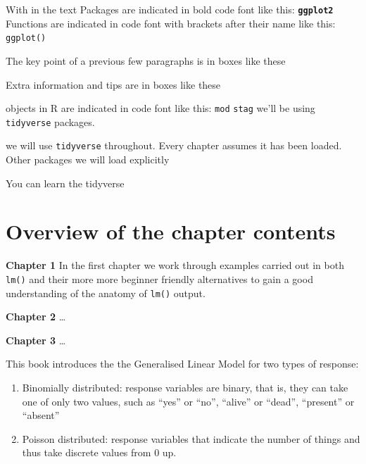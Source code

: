 \documentclass[
]{book}
\providecommand{\tightlist}{%
  \setlength{\itemsep}{0pt}\setlength{\parskip}{0pt}}
\begin{document}
With in the text
Packages are indicated in bold code font like this: \textbf{\texttt{ggplot2}}
Functions are indicated in code font with brackets after their name like this: \texttt{ggplot()}

\begin{key}

The key point of a previous few paragraphs is in boxes like these

\end{key}

\begin{fyi}

Extra information and tips are in boxes like these

\end{fyi}

objects in R are indicated in code font like this: \texttt{mod} \texttt{stag}
we'll be using \texttt{tidyverse} \citep{tidyverse2019} packages.

we will use \texttt{tidyverse} throughout. Every chapter assumes it has been loaded. Other packages we will load explicitly

\begin{fyi}

You can learn the tidyverse

\end{fyi}

\hypertarget{overview-of-the-chapter-contents}{%
\section{Overview of the chapter contents}\label{overview-of-the-chapter-contents}}

\textbf{Chapter 1}
In the first chapter we work through examples carried out in both \texttt{lm()} and their more more beginner friendly alternatives to gain a good understanding of the anatomy of \texttt{lm()} output.

\textbf{Chapter 2}
\ldots{}

\textbf{Chapter 3}
\ldots{}

This book introduces the the Generalised Linear Model for two types of response:

\begin{enumerate}
\def\labelenumi{\arabic{enumi}.}
\tightlist
\item
  Binomially distributed: response variables are binary, that is, they can take one of only two values, such as ``yes'' or ``no'', ``alive'' or ``dead'', ``present'' or ``absent''\\
\item
  Poisson distributed: response variables that indicate the number of things and thus take discrete values from 0 up.
\end{enumerate}
\end{document}
